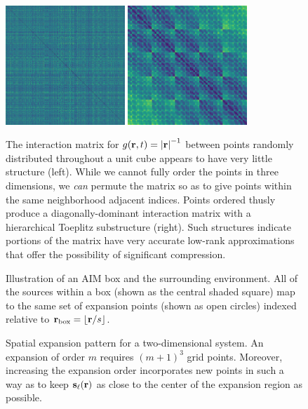 \begin{figure}
  \centering
  \includegraphics[width=0.4\textwidth]{figures/dist_mat_unsorted}
  \hspace{1cm}
  \includegraphics[width=0.4\textwidth]{figures/dist_mat_sorted}
  \caption{\label{fig:matrix structure} The interaction matrix for $g(\vb{r}, t) = \abs{\vb{r}}^{-1}$ between points randomly distributed throughout a unit cube appears to have very little structure (left).
    While we cannot fully order the points in three dimensions, we \emph{can} permute the matrix so as to give points within the same neighborhood adjacent indices.
    Points ordered thusly produce a diagonally-dominant interaction matrix with a hierarchical Toeplitz substructure (right).
    Such structures indicate portions of the matrix have very accurate low-rank approximations that offer the possibility of significant compression.
  }
\end{figure}

\begin{figure}
  \centering
  
  \caption{\label{fig:aim terminology} Illustration of an AIM box and the surrounding environment.
    All of the sources within a box (shown as the central shaded square) map to the same set of expansion points (shown as open circles) indexed relative to $\vb{r}_\text{box} = \lfloor\vb{r}/s\rfloor$.
  }
\end{figure}

\begin{figure}
  \centering
  \caption{\label{fig:expansion grid}Spatial expansion pattern for a two-dimensional system.
    An expansion of order $m$ requires $(m + 1)^3$ grid points.
    Moreover, increasing the expansion order incorporates new points in such a way as to keep $\vb{s}_\ell(\vb{r})$ as close to the center of the expansion region as possible.
  }
\end{figure}

